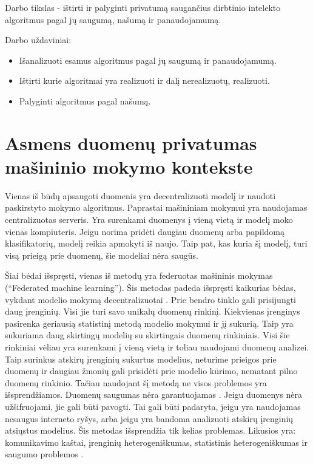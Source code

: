 \documentclass{VUMIFInfBakalaurinis}
\begin{document}
	\par Darbo tikslas - ištirti ir palyginti privatumą saugančius dirbtinio intelekto algoritmus pagal jų saugumą, našumą ir panaudojamumą.
	\par Darbo uždaviniai:
	\begin{itemize}
		\item Išanalizuoti esamus algoritmus pagal jų saugumą ir panaudojamumą.
		\item Ištirti kurie algoritmai yra realizuoti ir dalį nerealizuotų, realizuoti.
		\item Palyginti algoritmus pagal našumą. 
	\end{itemize}
\section{Asmens duomenų privatumas mašininio mokymo kontekste}
	\par Vienas iš būdų apsaugoti duomenis yra decentralizuoti modelį ir naudoti paskirstyto mokymo algoritmus. Paprastai mašininiam mokymui yra naudojamas centralizuotas serveris. Yra surenkami duomenys į vieną vietą ir modelį moko vienas kompiuteris. Jeigu norima pridėti daugiau duomenų arba papildomą klasifikatorių, modelį reikia apmokyti iš naujo. Taip pat, kas kuria šį modelį, turi visą prieigą prie duomenų, šie modeliai nėra saugūs. 
	\par Šiai bėdai išspręsti, vienas iš metodų yra federuotas mašininis mokymas (\enquote{Federated machine learning}). Šis metodas padeda išspręsti kaikurias bėdas, vykdant modelio mokymą decentralizuotai \cite{3}. Prie bendro tinklo gali prisijungti daug įrenginių. Visi jie turi savo unikalų duomenų rinkinį. Kiekvienas įrenginys pasirenka geriausią statistinį metodą modelio mokymui ir jį sukurią. Taip yra sukuriama daug skirtingų modelių su skirtingais duomenų rinkiniais. Visi šie rinkiniai vėliau yra surenkami į vieną vietą ir toliau naudojami duomenų analizei. Taip surinkus atskirų įrenginių sukurtus modelius, neturime prieigos prie duomenų ir daugiau žmonių gali prisidėti prie modelio kūrimo, nematant pilno duomenų rinkinio. Tačiau naudojant šį metodą ne visos problemos yra išsprendžiamos. Duomenų saugumas nėra garantuojamas \cite{3}. Jeigu duomenys nėra užšifruojami, jie gali būti pavogti. Tai gali būti padaryta, jeigu yra naudojamas nesaugus interneto ryšys, arba jeigu yra bandoma analizuoti atskirų įrenginių atsiųstus modelius. Šis metodas išsprendžia tik kelias problemas. Likusios yra: komunikavimo kaštai, įrenginių heterogeniškumas, statistinis heterogeniškumas ir saugumo problemos \cite{4}.
\end{document}
